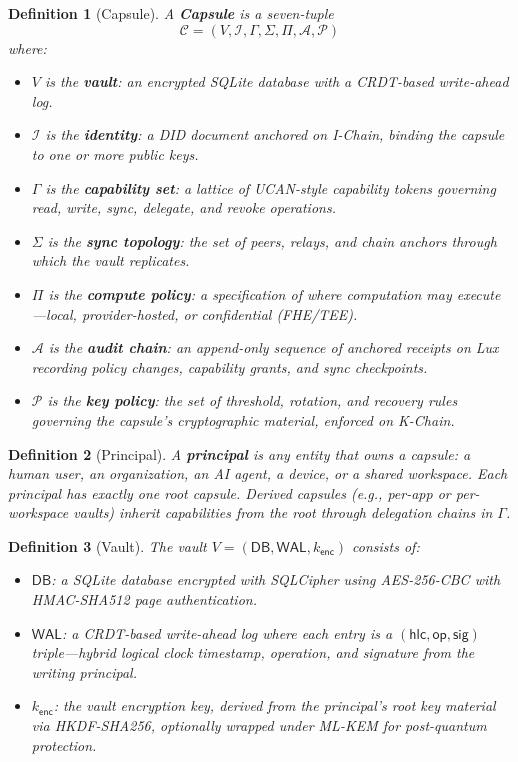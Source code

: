 \documentclass[11pt,a4paper]{article}
\newtheorem{definition}{Definition}[section]
\begin{document}
\begin{definition}[Capsule]\label{def:capsule}
A \textbf{Capsule} is a seven-tuple
\[
  \mathcal{C} = (V, \mathcal{I}, \Gamma, \Sigma, \Pi, \mathcal{A}, \mathcal{P})
\]
where:
\begin{itemize}[nosep]
  \item $V$ is the \textbf{vault}: an encrypted SQLite database with a CRDT-based
        write-ahead log.
  \item $\mathcal{I}$ is the \textbf{identity}: a DID document anchored on I-Chain,
        binding the capsule to one or more public keys.
  \item $\Gamma$ is the \textbf{capability set}: a lattice of UCAN-style
        capability tokens governing read, write, sync, delegate, and revoke
        operations.
  \item $\Sigma$ is the \textbf{sync topology}: the set of peers, relays,
        and chain anchors through which the vault replicates.
  \item $\Pi$ is the \textbf{compute policy}: a specification of where computation
        may execute---local, provider-hosted, or confidential (FHE/TEE).
  \item $\mathcal{A}$ is the \textbf{audit chain}: an append-only sequence of
        anchored receipts on Lux recording policy changes, capability grants,
        and sync checkpoints.
  \item $\mathcal{P}$ is the \textbf{key policy}: the set of threshold, rotation,
        and recovery rules governing the capsule's cryptographic material,
        enforced on K-Chain.
\end{itemize}
\end{definition}

\begin{definition}[Principal]\label{def:principal}
A \textbf{principal} is any entity that owns a capsule: a human user, an
organization, an AI agent, a device, or a shared workspace. Each principal
has exactly one root capsule. Derived capsules (e.g., per-app or per-workspace
vaults) inherit capabilities from the root through delegation chains in $\Gamma$.
\end{definition}

\begin{definition}[Vault]\label{def:vault}
The vault $V = (\mathsf{DB}, \mathsf{WAL}, k_{\mathsf{enc}})$ consists of:
\begin{itemize}[nosep]
  \item $\mathsf{DB}$: a SQLite database encrypted with SQLCipher using AES-256-CBC
        with HMAC-SHA512 page authentication.
  \item $\mathsf{WAL}$: a CRDT-based write-ahead log where each entry is a
        $(\mathsf{hlc}, \mathsf{op}, \mathsf{sig})$ triple---hybrid logical clock
        timestamp, operation, and signature from the writing principal.
  \item $k_{\mathsf{enc}}$: the vault encryption key, derived from the principal's
        root key material via HKDF-SHA256, optionally wrapped under ML-KEM for
        post-quantum protection.
\end{itemize}
\end{definition}
\end{document}
